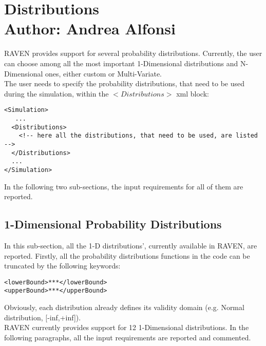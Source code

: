 \section{Distributions \\ \vspace{2 mm} {\small Author: Andrea Alfonsi}}
\label{sec:distributions}
\newcommand{\distname}[1]{\textbf{#1}}
\newcommand{\distattrib}[1]{\textit{#1}}
RAVEN provides support for several probability distributions. Currently, the user can choose among all the most important 1-Dimensional distributions and N-Dimensional ones, either custom or Multi-Variate.  
\\ The user needs to specify the probability distributions, that need to be used during the simulation, within the $<Distributions>$ xml block:
\begin{lstlisting}[style=XML]
<Simulation>
   ...
  <Distributions>
    <!-- here all the distributions, that need to be used, are listed -->
  </Distributions>
  ...
</Simulation>
\end{lstlisting}
In the following two sub-sections, the input requirements for all of them are reported.
\subsection{1-Dimensional Probability Distributions}
\label{subsec:1dDist}

In this sub-section, all the 1-D distributions', currently available in RAVEN, are reported. Firstly, all the probability distributions functions in the code can be truncated by the following keywords:
\begin{lstlisting}[style=XML]
<lowerBound>***</lowerBound>
<upperBound>***</upperBound>
\end{lstlisting}
Obviously, each distribution already defines its validity domain (e.g. Normal distribution, [-inf,+inf]).
\\ RAVEN currently provides support for 12 1-Dimensional distributions.  In the following paragraphs, all the input requirements are reported and commented.

